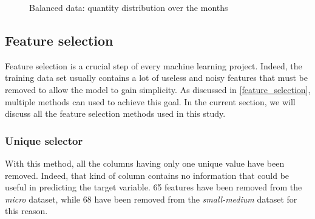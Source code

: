 \documentclass[LaM,binding=0.6cm, english]{sapthesis}
\begin{document}
\begin{figure}[!ht]
  \centering
  \hfill
  \caption{Balanced data: quantity distribution over the months}
\end{figure}

\subsection{Feature selection}

Feature selection is a crucial step of every machine learning project. Indeed, the training data set usually contains a lot of useless and noisy features that must be removed to allow the model to gain simplicity. As discussed in \ref{feature_selection}, multiple methods can used to achieve this goal. In the current section, we will discuss all the feature selection methods used in this study.

\subsubsection{Unique selector}

With this method, all the columns having only one unique value have been removed. Indeed, that kind of column contains no information that could be useful in predicting the target variable. 65 features have been removed from the \textit{micro} dataset, while 68 have been removed from the \textit{small-medium} dataset for this reason.
\end{document}
